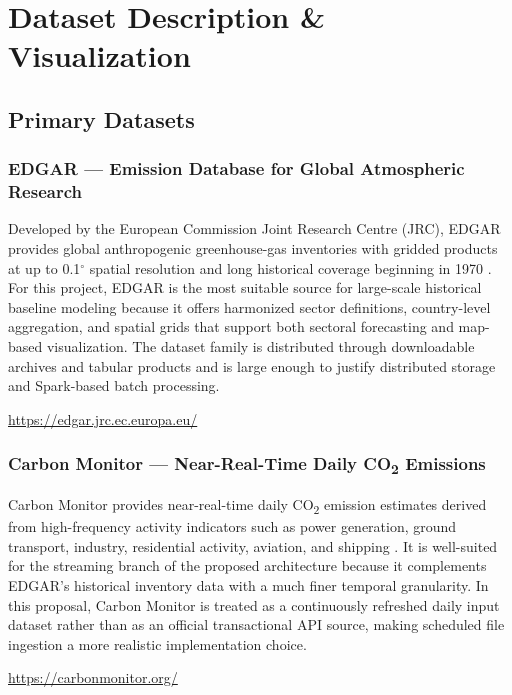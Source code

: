 \documentclass[conference]{IEEEtran}
\begin{document}
\section{Dataset Description \& Visualization}

\subsection{Primary Datasets}

\subsubsection{EDGAR — Emission Database for Global Atmospheric Research}
Developed by the European Commission Joint Research Centre (JRC), EDGAR provides global anthropogenic greenhouse-gas inventories with gridded products at up to 0.1$^{\circ}$ spatial resolution and long historical coverage beginning in 1970 \cite{edgar2021}. For this project, EDGAR is the most suitable source for large-scale historical baseline modeling because it offers harmonized sector definitions, country-level aggregation, and spatial grids that support both sectoral forecasting and map-based visualization. The dataset family is distributed through downloadable archives and tabular products and is large enough to justify distributed storage and Spark-based batch processing.
\begin{center}
\url{https://edgar.jrc.ec.europa.eu/}
\end{center}

\subsubsection{Carbon Monitor — Near-Real-Time Daily CO\textsubscript{2} Emissions}
Carbon Monitor provides near-real-time daily CO\textsubscript{2} emission estimates derived from high-frequency activity indicators such as power generation, ground transport, industry, residential activity, aviation, and shipping \cite{carbonmonitor2020}. It is well-suited for the streaming branch of the proposed architecture because it complements EDGAR's historical inventory data with a much finer temporal granularity. In this proposal, Carbon Monitor is treated as a continuously refreshed daily input dataset rather than as an official transactional API source, making scheduled file ingestion a more realistic implementation choice.
\begin{center}
\url{https://carbonmonitor.org/}
\end{center}
\end{document}
